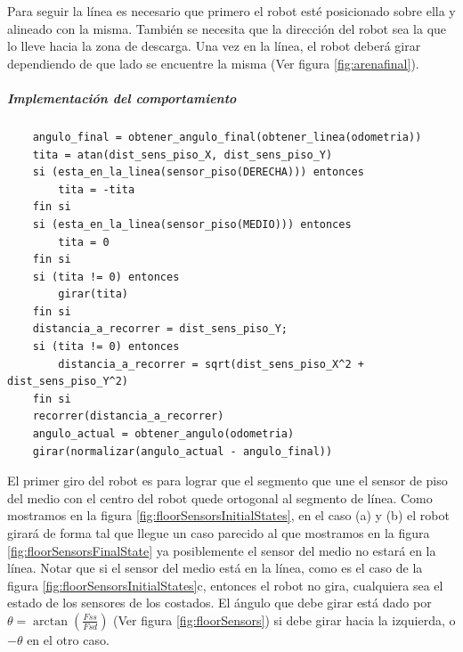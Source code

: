 Para seguir la l\'inea es necesario que primero el robot est\'e posicionado
sobre ella y alineado con la misma. Tambi\'en se necesita que la direcci\'on
del robot sea la que lo lleve hacia la zona de descarga. Una vez en
la l\'inea, el robot deber\'a girar dependiendo de que lado se encuentre la
misma (Ver figura \ref{fig:arenafinal}).

\subparagraph{Implementaci\'on del comportamiento}
\begin{verbatim}
    angulo_final = obtener_angulo_final(obtener_linea(odometria))
    tita = atan(dist_sens_piso_X, dist_sens_piso_Y)
    si (esta_en_la_linea(sensor_piso(DERECHA))) entonces
        tita = -tita
    fin si
    si (esta_en_la_linea(sensor_piso(MEDIO))) entonces
        tita = 0
    fin si
    si (tita != 0) entonces
        girar(tita)
    fin si
    distancia_a_recorrer = dist_sens_piso_Y;
    si (tita != 0) entonces
        distancia_a_recorrer = sqrt(dist_sens_piso_X^2 + dist_sens_piso_Y^2)
    fin si
    recorrer(distancia_a_recorrer)
    angulo_actual = obtener_angulo(odometria)
    girar(normalizar(angulo_actual - angulo_final))
\end{verbatim}

El primer giro del robot es para lograr que el segmento que une el sensor de
piso del medio con el centro del robot quede ortogonal al segmento de l\'inea.
Como mostramos en la figura \ref{fig:floorSensorsInitialStates}, en el caso
(a) y (b) el robot girar\'a de forma tal que llegue un caso parecido al que
mostramos en la figura \ref{fig:floorSensorsFinalState} ya posiblemente el
sensor del medio no estar\'a en la l\'inea. Notar que si el sensor del medio
est\'a en la l\'inea, como es el caso de la figura
\ref{fig:floorSensorsInitialStates}c,
entonces el robot no gira, cualquiera sea el estado de los sensores de los
costados. El \'angulo que debe girar est\'a dado por $\theta = \arctan
(\frac{Fss}{Fsd})$ (Ver figura \ref{fig:floorSensors}) si debe girar hacia
la izquierda, o $-\theta$ en el otro caso.

